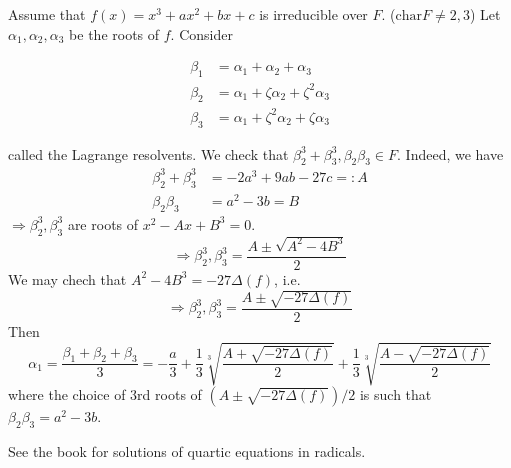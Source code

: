 \documentclass{article}
\theoremstyle{definition}
\newcommand{\Ra}{\Rightarrow}
\newcommand{\cha}{\text{char}}
\begin{document}
\par Assume that $f(x) = x^3 + a x^2 + bx + c$ is irreducible over $F$. ($\cha F \neq 2, 3$)
Let $\alpha_1, \alpha_2, \alpha_3$ be the roots of $f$.
Consider 

\begin{align*}
	\beta_1 &= \alpha_1 + \alpha_2 + \alpha_3\\
	\beta_2 &= \alpha_1 + \zeta \alpha_2 + \zeta^2 \alpha_3\\
	\beta_3 &= \alpha_1 + \zeta^2 \alpha_2 + \zeta \alpha_3
\end{align*}

called the Lagrange resolvents.
We check that $\beta_2^3 + \beta_3^3, \beta_2 \beta_3 \in F$.
Indeed, we have
\begin{align*}
	\beta_2^3 + \beta_3^3 &= -2 a^3 + 9ab - 27 c =: A\\
	\beta_2 \beta_3 &= a^2 - 3b = B
\end{align*}
$\Ra \beta_2^3, \beta_3^3$ are roots of $x^2 - Ax + B^3 = 0$.
\[
	\Ra \beta_2^3, \beta_3^3 = \frac{A \pm \sqrt{A^2 - 4B^3}}{2}
\]
We may chech that $A^2 - 4B^3 = -27 \Delta(f)$, i.e. 
\[
	\Ra \beta_2^3, \beta_3^3 = \frac{A \pm \sqrt{-27 \Delta(f)}}{2}
\]
Then 
\[
	\alpha_1 = \frac{\beta_1 + \beta_2 + \beta_3}{3} = -\frac{a}{3} + \frac{1}{3} \sqrt[3]{\frac{A + \sqrt{-27 \Delta(f)}}{2}} + \frac{1}{3} \sqrt[3]{\frac{A - \sqrt{-27 \Delta(f)}}{2}}   
\]
where the choice of 3rd roots of $(A \pm \sqrt{-27 \Delta(f)})/2$ is such that $\beta_2 \beta_3 = a^2 - 3b$.

\par See the book for solutions of quartic equations in radicals.
	
\end{document}
